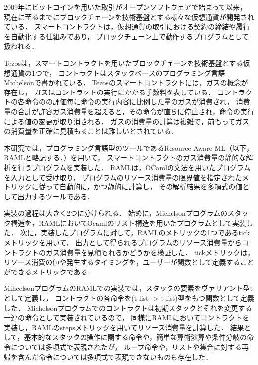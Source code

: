 \documentclass{kuisthesis}
\date{2021年2月2日}
\begin{document}
\maketitle

\begin{jabstract}
2009年にビットコインを用いた取引がオープンソフトウェアで始まって以来，
現在に至るまでにブロックチェーンを技術基盤とする様々な仮想通貨が開発されている．
スマートコントラクトは，仮想通貨の取引における契約の締結や履行を自動化する仕組みであり，
ブロックチェーン上で動作するプログラムとして扱われる．

Tezosは，スマートコントラクトを用いたブロックチェーンを技術基盤とする仮想通貨の1つで，
コントラクトはスタックベースのプログラミング言語Michelsonで書かれている．
Tezosのスマートコントラクトには，ガスの概念が存在し，
ガスはコントラクトの実行にかかる手数料を表している．
コントラクトの各命令のの評価毎に命令の実行内容に比例した量のガスが消費され，
消費量の合計が許容ガス消費量を超えると，その命令が直ちに停止され，命令の実行による値の変更が取り消される．
ガスの消費量の計算は複雑で，前もってガスの消費量を正確に見積もることは難しいとされている．

本研究では，プログラミング言語型のツールであるResource Aware ML（以下，RAMLと略記する．）を用いて，
スマートコントラクトのガス消費量の静的な解析を行うプログラムを実装した．
RAMLは，OCamlの文法を用いたプログラムを入力として受け取り，
プログラムのリソース消費量の限界値を指定されたメトリックに従って自動的に，かつ静的に計算し，
その解析結果を多項式の値として出力するツールである．

実装の過程は大きく2つに分けられる．
始めに，Michelsonプログラムのスタック構造を，RAMLにおいてOcamlのリスト構造を用いたプログラムとして実装した．
次に，実装したプログラムに対して，RAMLのメトリックの1つであるtickメトリックを用いて，
出力として得られるプログラムのリソース消費量からコントラクトのガス消費量を見積もれるかどうかを検証した．
tickメトリックは，リソース消費の値や発生するタイミングを，ユーザーが関数として定義することができるメトリックである．

MihcelsonプログラムのRAMLでの実装では，スタックの要素をヴァリアント型tとして定義し，
コントラクトの各命令を(t list -> t list)型をもつ関数として定義した．
Michelsonプログラムでのコントラクトは初期スタックとそれを変更する一連の命令として実装されているので，
同様にRAMLにおいてコントラクトを実装し，RAMLのstepsメトリックを用いてリソース消費量を計算した．
結果として，基本的なスタックの操作に関する命令や，簡単な算術演算や条件分岐の命令については多項式で表現されたが，
ループ命令や，リストや集合に対する再帰を含んだ命令については多項式で表現できないものも存在した．


\end{jabstract}
\end{document}
